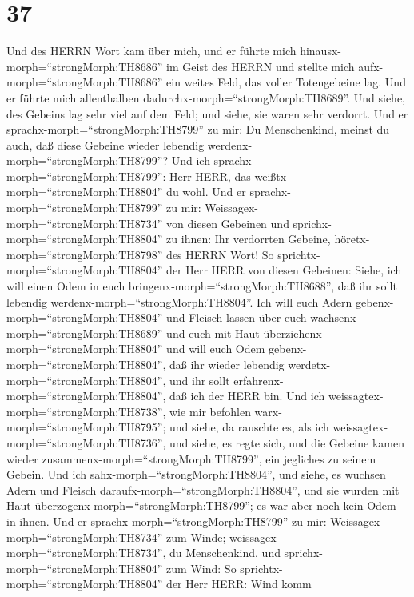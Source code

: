 \hypertarget{section-36}{%
\section{37}\label{section-36}}

 Und des HERRN Wort kam über mich, und er führte mich
hinausx-morph=``strongMorph:TH8686'' im Geist des HERRN und stellte mich
aufx-morph=``strongMorph:TH8686'' ein weites Feld, das voller
Totengebeine lag.  Und er führte mich allenthalben
dadurchx-morph=``strongMorph:TH8689''. Und siehe, des Gebeins lag sehr
viel auf dem Feld; und siehe, sie waren sehr verdorrt.  Und
er sprachx-morph=``strongMorph:TH8799'' zu mir: Du Menschenkind, meinst
du auch, daß diese Gebeine wieder lebendig
werdenx-morph=``strongMorph:TH8799''? Und ich
sprachx-morph=``strongMorph:TH8799'': Herr HERR, das
weißtx-morph=``strongMorph:TH8804'' du wohl.  Und er
sprachx-morph=``strongMorph:TH8799'' zu mir:
Weissagex-morph=``strongMorph:TH8734'' von diesen Gebeinen und
sprichx-morph=``strongMorph:TH8804'' zu ihnen: Ihr verdorrten Gebeine,
höretx-morph=``strongMorph:TH8798'' des HERRN Wort!  So
sprichtx-morph=``strongMorph:TH8804'' der Herr HERR von diesen Gebeinen:
Siehe, ich will einen Odem in euch
bringenx-morph=``strongMorph:TH8688'', daß ihr sollt lebendig
werdenx-morph=``strongMorph:TH8804''.  Ich will euch Adern
gebenx-morph=``strongMorph:TH8804'' und Fleisch lassen über euch
wachsenx-morph=``strongMorph:TH8689'' und euch mit Haut
überziehenx-morph=``strongMorph:TH8804'' und will euch Odem
gebenx-morph=``strongMorph:TH8804'', daß ihr wieder lebendig
werdetx-morph=``strongMorph:TH8804'', und ihr sollt
erfahrenx-morph=``strongMorph:TH8804'', daß ich der HERR bin.
 Und ich weissagtex-morph=``strongMorph:TH8738'', wie mir
befohlen warx-morph=``strongMorph:TH8795''; und siehe, da rauschte es,
als ich weissagtex-morph=``strongMorph:TH8736'', und siehe, es regte
sich, und die Gebeine kamen wieder
zusammenx-morph=``strongMorph:TH8799'', ein jegliches zu seinem Gebein.
 Und ich sahx-morph=``strongMorph:TH8804'', und siehe, es
wuchsen Adern und Fleisch daraufx-morph=``strongMorph:TH8804'', und sie
wurden mit Haut überzogenx-morph=``strongMorph:TH8799''; es war aber
noch kein Odem in ihnen.  Und er
sprachx-morph=``strongMorph:TH8799'' zu mir:
Weissagex-morph=``strongMorph:TH8734'' zum Winde;
weissagex-morph=``strongMorph:TH8734'', du Menschenkind, und
sprichx-morph=``strongMorph:TH8804'' zum Wind: So
sprichtx-morph=``strongMorph:TH8804'' der Herr HERR: Wind komm

